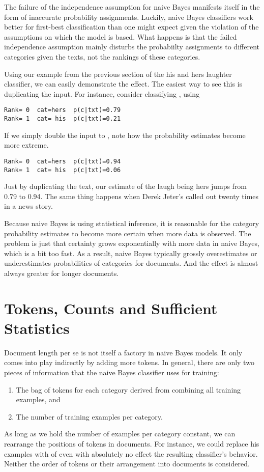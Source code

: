 The failure of the independence assumption for naive Bayes manifests
itself in the form of inaccurate probability assignments.  Luckily,
naive Bayes classifiers work better for first-best classification than
one might expect given the violation of the assumptions on which the
model is based.  What happens is that the failed independence
assumption mainly disturbs the probabiilty assignments to different
categories given the texts, not the rankings of these categories.

Using our example from the previous section of the his and hers
laughter classifier, we can easily demonstrate the effect.  The
easiest way to see this is duplicating the input.  For instance,
consider classifying , using
%
\begin{verbatim}
Rank= 0  cat=hers  p(c|txt)=0.79
Rank= 1  cat= his  p(c|txt)=0.21
\end{verbatim}
%
If we simply double the input to ,
note how the probability estimates become more extreme.
%
\begin{verbatim}
Rank= 0  cat=hers  p(c|txt)=0.94
Rank= 1  cat= his  p(c|txt)=0.06
\end{verbatim}
%
Just by duplicating the text, our estimate of the laugh being hers
jumps from 0.79 to 0.94.  The same thing happens when Derek Jeter's
called out twenty times in a news story.

Because naive Bayes is using statistical inference, it is reasonable
for the category probability estimates to become more certain when
more data is observed.  The problem is just that certainty grows
exponentially with more data in naive Bayes, which is a bit too fast.
As a result, naive Bayes typically grossly overestimates or
underestimates probabilities of categories for documents.  And
the effect is almost always greater for longer documents.

\section{Tokens, Counts and Sufficient Statistics}

Document length per se is not itself a factory in naive Bayes models.
It only comes into play indirectly by adding more tokens.  In general,
there are only two pieces of information that the naive Bayes classifier
uses for training:
%
\begin{enumerate}
\item The bag of tokens for each category derived from combining all
  training examples, and
\item The number of training examples per category.
\end{enumerate}
%
As long as we hold the number of examples per category constant, we
can rearrange the positions of tokens in documents.  For instance,
we could replace his examples
%
%
with
%
%
of even
%
%
with absolutely no effect the resulting classifier's behavior.  Neither
the order of tokens or their arrangement into documents is considered.


